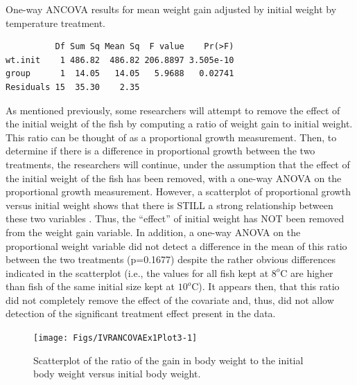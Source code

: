 \documentclass[10pt,openany]{book}\usepackage[]{graphicx}\usepackage[]{color}
\makeatletter
\newenvironment{kframe}{%
 \def\at@end@of@kframe{}%
 \ifinner\ifhmode%
  \def\at@end@of@kframe{\end{minipage}}%
  \begin{minipage}{\columnwidth}%
 \fi\fi%
 \def\FrameCommand##1{\hskip\@totalleftmargin \hskip-\fboxsep
 \colorbox{shadecolor}{##1}\hskip-\fboxsep
     \hskip-\linewidth \hskip-\@totalleftmargin \hskip\columnwidth}%
 \MakeFramed {\advance\hsize-\width
   \@totalleftmargin\z@ \linewidth\hsize
   \@setminipage}}%
 {\par\unskip\endMakeFramed%
 \at@end@of@kframe}
\newenvironment{knitrout}{}{} %
\makeatother
\begin{document}
\begin{table}[h]
  \centering
  \caption{One-way ANCOVA results for mean weight gain adjusted by initial weight by temperature treatment.}\label{tab:IVRANCOVAEx1Res2}
\begin{knitrout}
\color{fgcolor}\begin{kframe}
\begin{verbatim}
          Df Sum Sq Mean Sq  F value    Pr(>F)
wt.init    1 486.82  486.82 206.8897 3.505e-10
group      1  14.05   14.05   5.9688   0.02741
Residuals 15  35.30    2.35                   
\end{verbatim}
\end{kframe}
\end{knitrout}
\end{table}


As mentioned previously, some researchers will attempt to remove the effect of the initial weight of the fish by computing a ratio of weight gain to initial weight.  This ratio can be thought of as a proportional growth measurement.  Then, to determine if there is a difference in proportional growth between the two treatments, the researchers will continue, under the assumption that the effect of the initial weight of the fish has been removed, with a one-way ANOVA on the proportional growth measurement.  However, a scatterplot of proportional growth versus initial weight shows that there is STILL a strong relationship between these two variables .  Thus, the ``effect'' of initial weight has NOT been removed from the weight gain variable.  In addition, a one-way ANOVA on the proportional weight variable did not detect a difference in the mean of this ratio between the two treatments (p=0.1677) despite the rather obvious differences indicated in the scatterplot (i.e., the values for all fish kept at $8^{o}$C are higher than fish of the same initial size kept at $10^{o}$C).  It appears then, that this ratio did not completely remove the effect of the covariate and, thus, did not allow detection of the significant treatment effect present in the data.

\begin{knitrout}
\color{fgcolor}\begin{figure}[h]

{\centering \texttt{[image: Figs/IVRANCOVAEx1Plot3-1]} 

}

\caption[Scatterplot of the ratio of the gain in body weight to the initial body weight versus initial body weight]{Scatterplot of the ratio of the gain in body weight to the initial body weight versus initial body weight.}\label{fig:IVRANCOVAEx1Plot3}
\end{figure}


\end{knitrout}
\end{document}
